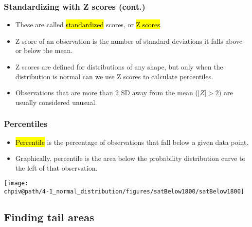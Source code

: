 \documentclass[slidestop,compress,mathserif]{beamer}
\makeatletter
\def\chpiv@path{../../Chp 4}
\makeatother
\begin{document}
\begin{frame}
\frametitle{Standardizing with Z scores (cont.)}

\begin{itemize}

\item These are called \hl{standardized} scores, or \hl{Z scores}.

\item Z score of an observation is the number of standard deviations it falls above or below the mean.
\formula{\[Z = \frac{observation - mean}{SD}\]}

\item Z scores are defined for distributions of any shape, but only when the distribution is normal can we use Z scores to calculate percentiles.

\item Observations that are more than 2 SD away from the mean ($|Z| > 2$) are usually considered unusual.

\end{itemize}

\end{frame}


\begin{frame}
\frametitle{Percentiles}

\begin{itemize}

\item \hl{Percentile} is the percentage of observations that fall below a given data point. 

\item Graphically, percentile is the area below the probability distribution curve to the left of that observation.

\end{itemize}

\begin{center}
\texttt{[image: \\chpiv@path/4-1\_normal\_distribution/figures/satBelow1800/satBelow1800]}
\end{center}

\end{frame}

\subsection{Finding tail areas}

\end{document}
